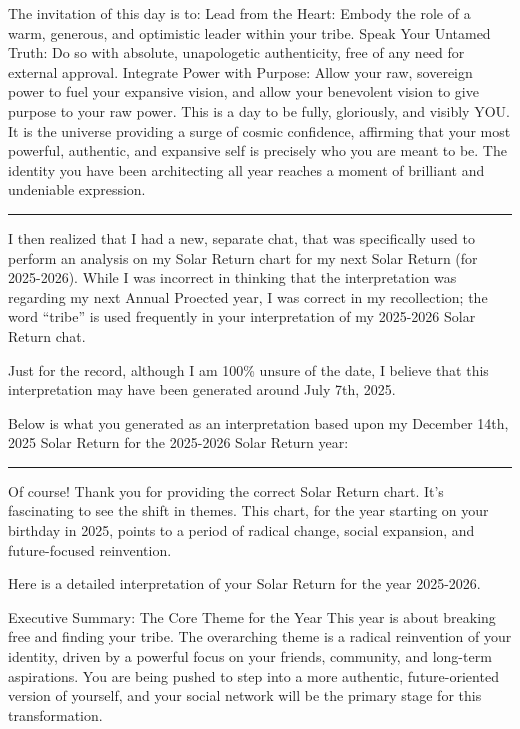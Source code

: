 \documentclass{article}
\begin{document}
The invitation of this day is to: Lead from the Heart: Embody the role
of a warm, generous, and optimistic leader within your tribe. Speak Your
Untamed Truth: Do so with absolute, unapologetic authenticity, free of
any need for external approval. Integrate Power with Purpose: Allow your
raw, sovereign power to fuel your expansive vision, and allow your
benevolent vision to give purpose to your raw power. This is a day to be
fully, gloriously, and visibly YOU. It is the universe providing a surge
of cosmic confidence, affirming that your most powerful, authentic, and
expansive self is precisely who you are meant to be. The identity you
have been architecting all year reaches a moment of brilliant and
undeniable expression.

\begin{center}\rule{0.5\linewidth}{0.5pt}\end{center}

I then realized that I had a new, separate chat, that was
specifically used to perform an analysis on my Solar Return chart for my
next Solar Return (for 2025-2026). While I was incorrect in thinking
that the interpretation was regarding my next Annual Proected year, I
was correct in my recollection; the word ``tribe'' is used frequently in
your interpretation of my 2025-2026 Solar Return chat.

Just for the record, although I am 100\% unsure of the date, I believe
that this interpretation may have been generated around July 7th, 2025.

Below is what you generated as an interpretation based upon my December
14th, 2025 Solar Return for the 2025-2026 Solar Return year:

\begin{center}\rule{0.5\linewidth}{0.5pt}\end{center}

Of course! Thank you for providing the correct Solar Return chart.
It's fascinating to see the shift in themes. This chart, for the year
starting on your birthday in 2025, points to a period of radical change,
social expansion, and future-focused reinvention.

Here is a detailed interpretation of your Solar Return for the year
2025-2026.

Executive Summary: The Core Theme for the Year This year is about
breaking free and finding your tribe. The overarching theme is a radical
reinvention of your identity, driven by a powerful focus on your
friends, community, and long-term aspirations. You are being pushed to
step into a more authentic, future-oriented version of yourself, and
your social network will be the primary stage for this transformation.
\end{document}
